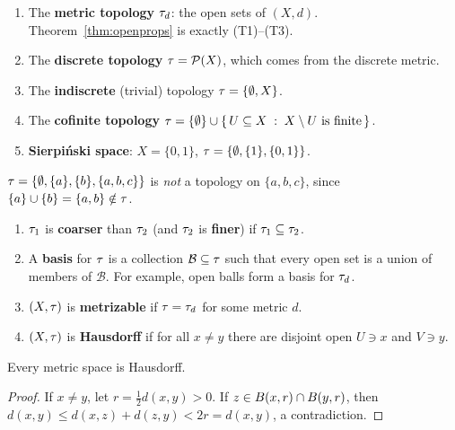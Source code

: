 \begin{example}\label{ex:topologies}
\leavevmode
\begin{enumerate}[label=(\alph*)]
  \item The \textbf{metric topology} $\tau_d$: the open sets of $(X,d)$. Theorem~\ref{thm:openprops} is exactly \textup{(T1)--(T3)}.
  \item The \textbf{discrete topology} $\tau=\mathcal P(X)$, which comes from the discrete metric.
  \item The \textbf{indiscrete} (trivial) topology $\tau=\{\emptyset,X\}$.
  \item The \textbf{cofinite topology} $\tau=\{\emptyset\}\cup\left\{\, U\subseteq X \;:\; X\setminus U\text{ is finite} \,\right\}$.
  \item \textbf{Sierpiński space}: $X=\{0,1\}$, $\tau=\{\emptyset,\{1\},\{0,1\}\}$.
\end{enumerate}
\end{example}

\begin{example}
$\tau=\{\emptyset,\{a\},\{b\},\{a,b,c\}\}$ is \emph{not} a topology on $\{a,b,c\}$, since $\{a\}\cup\{b\}=\{a,b\}\notin\tau$.
\end{example}

\begin{definition}\label{def:hausdorff}
\leavevmode
\begin{enumerate}[label=(\roman*)]
  \item $\tau_1$ is \textbf{coarser} than $\tau_2$ (and $\tau_2$ is \textbf{finer}) if $\tau_1\subseteq\tau_2$.
  \item A \textbf{basis} for $\tau$ is a collection $\mathcal B\subseteq\tau$ such that every open set is a union of members of $\mathcal B$. For example, open balls form a basis for $\tau_d$.
  \item $(X,\tau)$ is \textbf{metrizable} if $\tau=\tau_d$ for some metric $d$.
  \item $(X,\tau)$ is \textbf{Hausdorff} if for all $x\ne y$ there are disjoint open $U\ni x$ and $V\ni y$.
\end{enumerate}
\end{definition}

\begin{theorem}\label{thm:metrichausdorff}
Every metric space is Hausdorff.
\end{theorem}
\begin{proof}
If $x\ne y$, let $r=\tfrac12d(x,y)>0$. If $z\in B(x,r)\cap B(y,r)$, then $d(x,y)\le d(x,z)+d(z,y)<2r=d(x,y)$, a contradiction.
\end{proof}

